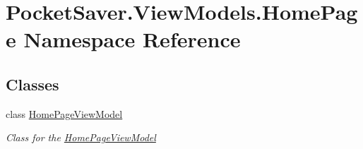 \hypertarget{namespace_pocket_saver_1_1_view_models_1_1_home_page}{}\section{Pocket\+Saver.\+View\+Models.\+Home\+Page Namespace Reference}
\label{namespace_pocket_saver_1_1_view_models_1_1_home_page}
\subsection*{Classes}
\begin{DoxyCompactItemize}
\item 
class \hyperlink{class_pocket_saver_1_1_view_models_1_1_home_page_1_1_home_page_view_model}{Home\+Page\+View\+Model}
\begin{DoxyCompactList}\small\item\em Class for the \hyperlink{class_pocket_saver_1_1_view_models_1_1_home_page_1_1_home_page_view_model}{Home\+Page\+View\+Model} \end{DoxyCompactList}\end{DoxyCompactItemize}
